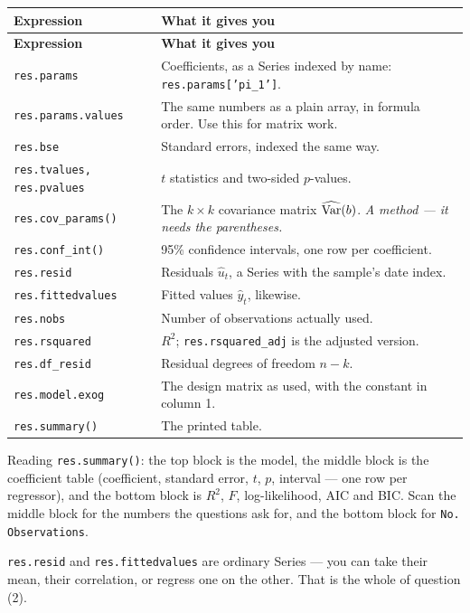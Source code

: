 \documentclass[11pt]{article}
\newcommand{\code}[1]{\texttt{#1}}
\begin{document}
\begin{center}
\begin{longtable}{@{}p{4.3cm}p{11.7cm}@{}}
\toprule
\textbf{Expression} & \textbf{What it gives you} \\
\midrule
\endfirsthead
\toprule
\textbf{Expression} & \textbf{What it gives you} \\
\midrule
\endhead
\code{res.params} & Coefficients, as a Series indexed by name: \code{res.params['pi\_1']}. \\
\code{res.params.values} & The same numbers as a plain array, in formula order. Use this for matrix work. \\
\code{res.bse} & Standard errors, indexed the same way. \\
\code{res.tvalues, res.pvalues} & $t$ statistics and two-sided $p$-values. \\
\code{res.cov\_params()} & The $k \times k$ covariance matrix $\widehat{\operatorname{Var}}(b)$. \emph{A method --- it needs the parentheses.} \\
\code{res.conf\_int()} & 95\% confidence intervals, one row per coefficient. \\
\code{res.resid} & Residuals $\hat u_t$, a Series with the sample's date index. \\
\code{res.fittedvalues} & Fitted values $\hat y_t$, likewise. \\
\code{res.nobs} & Number of observations actually used. \\
\code{res.rsquared} & $R^2$; \code{res.rsquared\_adj} is the adjusted version. \\
\code{res.df\_resid} & Residual degrees of freedom $n-k$. \\
\code{res.model.exog} & The design matrix as used, with the constant in column 1. \\
\code{res.summary()} & The printed table. \\
\bottomrule
\end{longtable}
\end{center}

\noindent Reading \code{res.summary()}: the top block is the model, the middle
block is the coefficient table (coefficient, standard error, $t$, $p$, interval
--- one row per regressor), and the bottom block is $R^2$, $F$, log-likelihood,
AIC and BIC. Scan the middle block for the numbers the questions ask for, and
the bottom block for \code{No. Observations}.

\noindent\code{res.resid} and \code{res.fittedvalues} are ordinary Series ---
you can take their mean, their correlation, or regress one on the other.
That is the whole of question (2).
\end{document}
